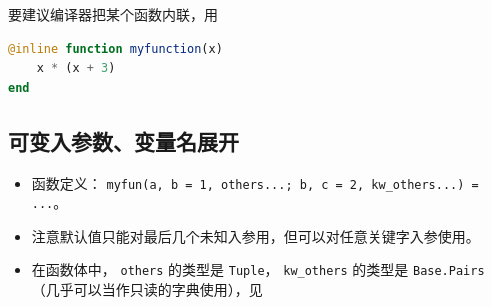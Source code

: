 要建议编译器把某个函数内联，用
\begin{lstlisting}[language=julia]
@inline function myfunction(x)
    x * (x + 3)
end
\end{lstlisting}

\subsection{可变入参数、变量名展开}
\begin{itemize}
\item 函数定义： \verb`myfun(a, b = 1, others...; b, c = 2, kw_others...) = ...`。
\item 注意默认值只能对最后几个未知入参用，但可以对任意关键字入参使用。
\item 在函数体中， \verb`others` 的类型是 \verb`Tuple`， \verb`kw_others` 的类型是 \verb`Base.Pairs`（几乎可以当作只读的字典使用），见
\end{itemize}
